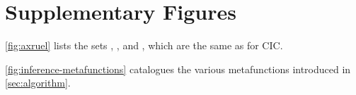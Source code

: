 \section{Supplementary Figures}\label{sec:supplementary}


\autoref{fig:axruel} lists the sets \Axioms, \Rules, and \Elims, which are the same as for CIC.

\autoref{fig:inference-metafunctions} catalogues the various metafunctions introduced in \autoref{sec:algorithm}.

